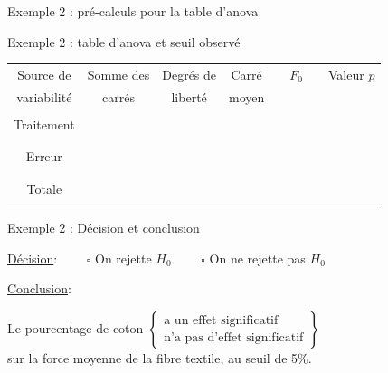 \documentclass{BeamerTemplate}
\begin{document}
\begin{frame}[t]{Exemple 2 : pré-calculs pour la table d'anova }


\end{frame}

\begin{frame}[t]{Exemple 2 : table d'anova et seuil observé }


\begin{tabular}{cccccc}\hline
Source de & Somme des & Degrés de & Carré  & $\quad F_0 \quad$ & Valeur $p$ \\
variabilité & carrés & liberté & moyen & & \\ \hline
\\
Traitement & %
\\ \\ \\
Erreur & %
\\  \\\hline \\
Totale & %
\\ \\ \hline
\end{tabular}

\end{frame}

\begin{frame}[t]{Exemple 2 : Décision et conclusion}

\underline{Décision}: $\qquad\square $ On rejette $H_0$ \hfill $\qquad\square $ On ne rejette pas $H_0$

\vspace{7mm}

\underline{Conclusion}: \\

\bigskip

Le pourcentage de coton $\left\{\begin{array}{c}\text{a un effet significatif}\\\text{n'a pas d'effet significatif}\end{array}\right\}$ \\

\medskip
sur la force moyenne de la fibre textile, au seuil de 5\%.
\end{frame}
\end{document}
